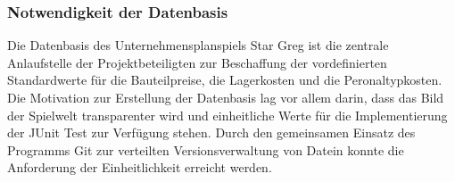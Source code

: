 \subsubsection{Notwendigkeit der Datenbasis}
\label{subsub:spielwelt-datenbasis-einleitung-notwendigkeit}

Die Datenbasis des Unternehmensplanspiels Star Greg ist die zentrale Anlaufstelle der Projektbeteiligten zur Beschaffung der vordefinierten Standardwerte für die Bauteilpreise, die Lagerkosten und die Peronaltypkosten. Die Motivation zur Erstellung der Datenbasis lag vor allem darin, dass das Bild der Spielwelt transparenter wird und einheitliche Werte für die Implementierung der JUnit Test zur Verfügung stehen. Durch den gemeinsamen Einsatz des Programms Git zur verteilten Versionsverwaltung von Datein konnte die Anforderung der Einheitlichkeit erreicht werden. 
